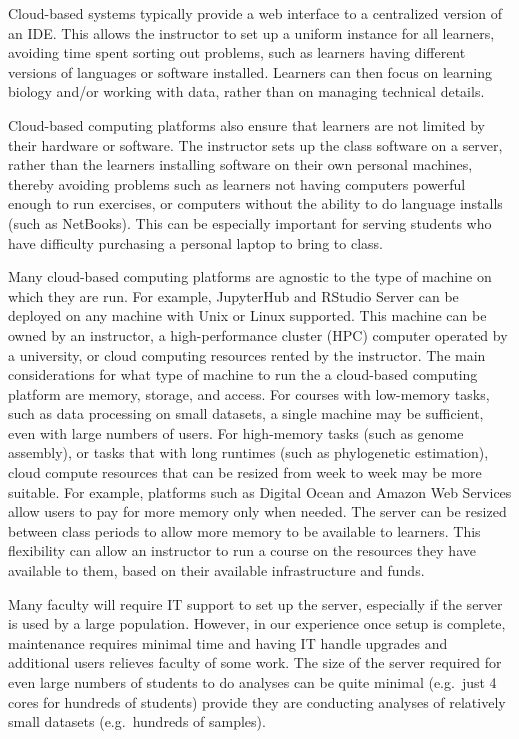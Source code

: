 Cloud-based systems typically provide a web interface to a centralized version of an IDE. This 
allows the instructor to set up a uniform instance for all learners, avoiding time spent sorting out problems, such as learners having different versions of languages or software installed.
Learners can then focus on learning biology and/or working with data, rather than on managing technical details.

Cloud-based computing platforms also ensure that learners
are not limited by their hardware or software. The instructor sets up the class software on a server, rather than the learners installing software on their own personal machines, thereby avoiding problems such as learners not having computers powerful enough to run exercises, or computers without the ability to do language installs (such as NetBooks). This can be especially important for serving students who have difficulty purchasing a personal laptop to bring to class.

Many cloud-based computing platforms are agnostic to the type of machine on which they are run. 
For example, JupyterHub and RStudio Server can be deployed on any machine with Unix or Linux supported. 
This machine can be owned by an instructor, a high-performance cluster (HPC) computer operated by a university, or cloud 
computing resources rented by the instructor.
The main considerations for what type of machine to run the a cloud-based computing platform are memory, storage, and access.
For courses with low-memory tasks, such as data processing on small datasets, a single machine may be sufficient, even with large numbers of users.
For high-memory tasks (such as genome assembly), or tasks that with long runtimes (such as phylogenetic estimation), 
cloud compute resources that can be resized from week to week may be more suitable.
For example, platforms such as Digital Ocean and Amazon Web Services allow users to pay for more memory only when needed. 
The server can be resized between class periods to allow more memory to be available to learners.
This flexibility can allow an instructor to run a course on the resources they have available to them, based on their available infrastructure and funds.

Many faculty will require IT support to set up the server, especially if the server is used by a large population. However, in our experience once setup is complete, maintenance requires minimal time and having IT handle upgrades and additional users relieves faculty of some work. The size of the server required for even large numbers of students to do analyses can be quite minimal (e.g.\ just 4 cores for hundreds of students) provide they are conducting analyses of relatively small datasets (e.g.\ hundreds of samples). 

